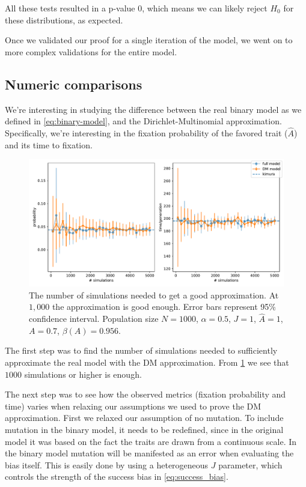 \documentclass[12pt]{extarticle}
\begin{document}
All these tests resulted in a p-value 0, which means we can likely reject $H_0$ for these distributions, as expected.

Once we validated our proof for a single iteration of the model, we went on to more complex validations for the entire model.


\subsection*{Numeric comparisons}
We're interesting in studying the difference between the real binary model as we defined in \cref{eq:binary-model}, and the Dirichlet-Multinomial approximation. Specifically, we're interesting in the fixation probability of the favored trait ($\hat{A}$) and its time to fixation.

\begin{figure}
    \includegraphics[width=\linewidth]{../figures/binary/num_sims.pdf}
  \caption{The number of simulations needed to get a good approximation. At $1,000$ the approximation is good enough. Error bars represent 95\% confidence interval. Population size $N=1000$, $\alpha=0.5$, $J=1$, $\hat{A}=1$,$A=0.7$, $\beta(A)=0.956$.}	
  \label{fig:num_sims}
\end{figure}


The first step was to find the number of simulations needed to sufficiently approximate the real model with the DM approximation. From \cref{fig:num_sims} we see that $1000$ simulations or higher is enough.

The next step was to see how the observed metrics (fixation probability and time) varies when relaxing our assumptions we used to prove the DM approximation.
First we relaxed our assumption of no mutation. To include mutation in the binary model, it needs to be redefined, since in the original model it was based on the fact the traits are drawn from a continuous scale. In the binary model mutation will be manifested as an error when evaluating the bias itself. This is easily done by using a heterogeneous $J$ parameter, which controls the strength of the success bias in \cref{eq:success_bias}.
\end{document}
